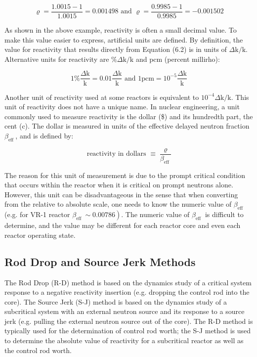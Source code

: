 \documentclass[10pt]{article}
\begin{document}
$$
\varrho=\frac{1.0015-1}{1.0015}=0.001498 \text { and } \varrho=\frac{0.9985-1}{0.9985}=-0.001502
$$

As shown in the above example, reactivity is often a small decimal value. To make this value easier to express, artificial units are defined. By definition, the value for reactivity that results directly from Equation (6.2) is in units of $\Delta \mathrm{k} / \mathrm{k}$. Alternative units for reactivity are $\% \Delta \mathrm{k} / \mathrm{k}$ and pcm (percent millirho):

$$
1 \% \frac{\Delta \mathrm{k}}{\mathrm{k}}=0.01 \frac{\Delta \mathrm{k}}{\mathrm{k}} \text { and } 1 \mathrm{pcm}=10^{-5} \frac{\Delta \mathrm{k}}{\mathrm{k}}
$$

Another unit of reactivity used at some reactors is equivalent to $10^{-4} \Delta \mathrm{k} / \mathrm{k}$. This unit of reactivity does not have a unique name. In nuclear engineering, a unit commonly used to measure reactivity is the dollar (\$) and its hundredth part, the cent (c). The dollar is measured in units of the effective delayed neutron fraction $\beta_{\text {eff }}$, and is defined by:

$$
\text { reactivity in dollars } \equiv \frac{\varrho}{\beta_{\text {eff }}}
$$

The reason for this unit of measurement is due to the prompt critical condition that occurs within the reactor when it is critical on prompt neutrons alone. However, this unit can be disadvantageous in the sense that when converting from the relative to absolute scale, one needs to know the numeric value of $\beta_{\text {eff }}$ (e.g. for VR-1 reactor $\left.\beta_{\text {eff }} \sim 0.00786\right)$. The numeric value of $\beta_{\text {eff }}$ is difficult to determine, and the value may be different for each reactor core and even each reactor operating state.

\subsection{Rod Drop and Source Jerk Methods}
The Rod Drop (R-D) method is based on the dynamics study of a critical system response to a negative reactivity insertion (e.g. dropping the control rod into the core). The Source Jerk (S-J) method is based on the dynamics study of a subcritical system with an external neutron source and its response to a source jerk (e.g. pulling the external neutron source out of the core). The R-D method is typically used for the determination of control rod worth; the S-J method is used to determine the absolute value of reactivity for a subcritical reactor as well as the control rod worth.
\end{document}
